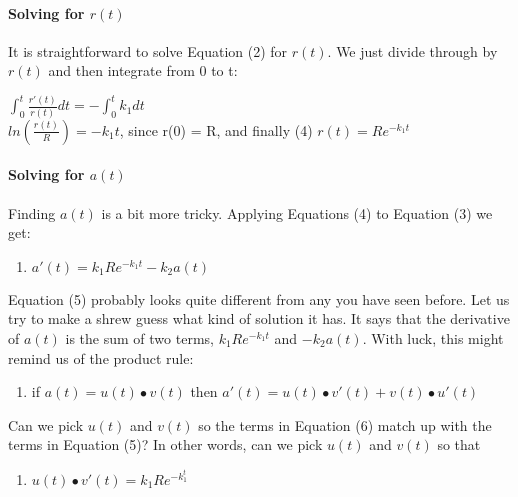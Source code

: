 \documentclass[]{article}
\providecommand{\tightlist}{%
  \setlength{\itemsep}{0pt}\setlength{\parskip}{0pt}}
\let\oldparagraph\paragraph
\renewcommand{\paragraph}[1]{\oldparagraph{#1}\mbox{}}
\begin{document}
\paragraph{\texorpdfstring{Solving for
\(r(t)\)}{Solving for r(t)}}\label{solving-for-rt}

It is straightforward to solve Equation (2) for \(r(t)\). We just divide
through by \(r(t)\) and then integrate from 0 to t:

\(\int_0^t \frac{r'(t)}{r(t)} dt= - \int_0^t k_1dt\)\\
\(ln(\frac{r(t)}{R}) = -k_1t\), since r(0) = R, and finally (4)
\(r(t) = Re^{-k_1t}\)

\paragraph{\texorpdfstring{Solving for
\(a(t)\)}{Solving for a(t)}}\label{solving-for-at}

Finding \(a(t)\) is a bit more tricky. Applying Equations (4) to
Equation (3) we get:

\begin{enumerate}
\def\labelenumi{(\arabic{enumi})}
\setcounter{enumi}{4}
\tightlist
\item
  \(a'(t) = k_1Re^{-k_1t}-k_2a(t)\)
\end{enumerate}

Equation (5) probably looks quite different from any you have seen
before. Let us try to make a shrew guess what kind of solution it has.
It says that the derivative of \(a(t)\) is the sum of two terms,
\(k_1Re^{-k_1t}\) and \(-k_2a(t)\). With luck, this might remind us of
the product rule:

\begin{enumerate}
\def\labelenumi{(\arabic{enumi})}
\setcounter{enumi}{5}
\tightlist
\item
  if \(a(t) = u(t) \bullet v(t)\) then
  \(a'(t) = u(t) \bullet v'(t) + v(t) \bullet u'(t)\)
\end{enumerate}

Can we pick \(u(t)\) and \(v(t)\) so the terms in Equation (6) match up
with the terms in Equation (5)? In other words, can we pick \(u(t)\) and
\(v(t)\) so that

\begin{enumerate}
\def\labelenumi{(\arabic{enumi})}
\setcounter{enumi}{6}
\tightlist
\item
  \(u(t) \bullet v'(t) = k_1Re^{-k_1^t}\)
\end{enumerate}
\end{document}
